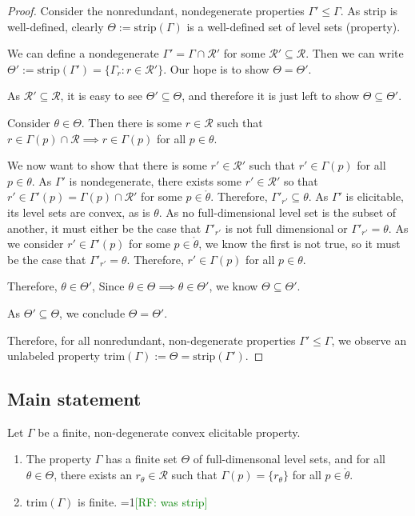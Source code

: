 \documentclass[12pt]{article}
\newcommand{\Comments}{1}
\newcommand{\mynote}[2]{\ifnum\Comments=1\textcolor{#1}{#2}\fi}
\newcommand{\raf}[1]{\mynote{green}{[RF: #1]}}
\newcommand{\R}{\mathcal{R}}
\newcommand{\inter}[1]{\mathring{#1}}%
\newcommand{\trim}{\mathrm{trim}}
\newcommand{\strip}{\text{strip}}
\begin{document}
\begin{proof}

Consider the nonredundant, nondegenerate properties $\Gamma' \leq \Gamma$.
As $\strip$ is well-defined, clearly $\Theta := \strip(\Gamma)$ is a well-defined set of level sets (property).

We can define a nondegenerate $\Gamma' = \Gamma \cap \R'$ for some $\R' \subseteq \R$.
Then we can write $\Theta' := \strip(\Gamma') = \{\Gamma_r : r \in \R' \}$.
Our hope is to show $\Theta = \Theta'$.

As $\R' \subseteq \R$, it is easy to see  $\Theta' \subseteq \Theta$, and therefore it is just left to show $\Theta \subseteq \Theta'$.

Consider $\theta \in \Theta$.
Then there is some $r \in \R$ such that $r\in\Gamma(p)\cap \R \implies r \in \Gamma(p)$ for all $p \in \theta$.

We now want to show that there is some $r' \in \R'$ such that $r' \in \Gamma(p)$ for all $p \in \theta$.
As $\Gamma'$ is nondegenerate, there exists some $r' \in \R'$ so that $r' \in \Gamma'(p) = \Gamma(p) \cap \R'$ for some $p \in \inter{\theta}$.
Therefore, $\Gamma'_{r'} \subseteq \theta$.
As $\Gamma'$ is elicitable, its level sets are convex, as is $\theta$.
As no full-dimensional level set is the subset of another, it must either be the case that $\Gamma'_{r'}$ is not full dimensional or $\Gamma'_{r'} = \theta$.
As we consider $r' \in \Gamma'(p)$ for some $p \in \inter{\theta}$, we know the first is not true, so it must be the case that $\Gamma'_{r'} = \theta$.
Therefore, $r' \in \Gamma(p)$ for all $p \in \theta$.

Therefore, $\theta \in \Theta'$,
Since $\theta \in \Theta \implies \theta \in \Theta'$, we know $\Theta \subseteq \Theta'$.

As $\Theta' \subseteq \Theta$, we conclude $\Theta = \Theta'$.

Therefore, for all nonredundant, non-degenerate properties $\Gamma' \leq \Gamma$, we observe an unlabeled property $\trim(\Gamma) := \Theta = \strip(\Gamma')$.

\end{proof}


\subsection{Main statement}

Let $\Gamma$ be a finite, non-degenerate convex elicitable property.

\begin{enumerate}
\item The property $\Gamma$ has a finite set $\Theta$ of full-dimensonal level sets, and for all $\theta \in \Theta$, there exists an $r_\theta \in \R$ such that $\Gamma(p) = \{r_\theta\}$ for all $p \in \inter{\theta}$.
\item $\trim(\Gamma)$ is finite.  \raf{was strip}
\end{enumerate}
\end{document}

